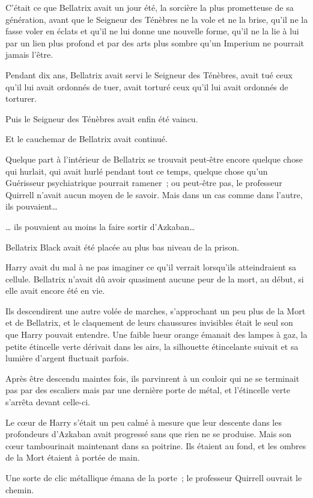 C'était ce que Bellatrix avait un jour été, la sorcière la plus prometteuse de sa génération, avant que le Seigneur des Ténèbres ne la vole et ne la brise, qu'il ne la fasse voler en éclats et qu'il ne lui donne une nouvelle forme, qu'il ne la lie à lui par un lien plus profond et par des arts plus sombre qu'un Imperium ne pourrait jamais l'être.

Pendant dix ans, Bellatrix avait servi le Seigneur des Ténèbres, avait tué ceux qu'il lui avait ordonnés de tuer, avait torturé ceux qu'il lui avait ordonnés de torturer.

Puis le Seigneur des Ténèbres avait enfin été vaincu.

Et le cauchemar de Bellatrix avait continué.

Quelque part à l'intérieur de Bellatrix se trouvait peut-être encore quelque chose qui hurlait, qui avait hurlé pendant tout ce temps, quelque chose qu'un Guérisseur psychiatrique pourrait ramener~; ou peut-être pas, le professeur Quirrell n'avait aucun moyen de le savoir. Mais dans un cas comme dans l'autre, ils pouvaient…

… ils pouvaient au moins la faire sortir d'Azkaban…

Bellatrix Black avait été placée au plus bas niveau de la prison.

Harry avait du mal à ne pas imaginer ce qu'il verrait lorsqu'ils atteindraient sa cellule. Bellatrix n'avait dû avoir quasiment aucune peur de la mort, au début, si elle avait encore été en vie.

Ils descendirent une autre volée de marches, s'approchant un peu plus de la Mort et de Bellatrix, et le claquement de leurs chaussures invisibles était le seul son que Harry pouvait entendre. Une faible lueur orange émanait des lampes à gaz, la petite étincelle verte dérivait dans les airs, la silhouette étincelante suivait et sa lumière d'argent fluctuait parfois.

\later

Après être descendu maintes fois, ils parvinrent à un couloir qui ne se terminait pas par des escaliers mais par une dernière porte de métal, et l'étincelle verte s'arrêta devant celle-ci.

Le cœur de Harry s'était un peu calmé à mesure que leur descente dans les profondeurs d'Azkaban avait progressé sans que rien ne se produise. Mais son cœur tambourinait maintenant dans sa poitrine. Ils étaient au fond, et les ombres de la Mort étaient à portée de main.

Une sorte de clic métallique émana de la porte~; le professeur Quirrell ouvrait le chemin.


